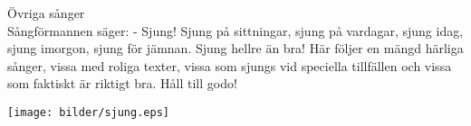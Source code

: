 \begin{flushleft}
{\Huge Övriga sånger\\}
\vspace{1cm}
{\Large
Sångförmannen säger:
- Sjung! Sjung på sittningar, sjung på vardagar, sjung idag, sjung
imorgon, sjung för jämnan. Sjung hellre än bra! Här följer en mängd härliga sånger, vissa
med roliga texter, vissa som sjungs vid speciella tillfällen och vissa
som faktiskt är riktigt bra. Håll till godo!
}
\end{flushleft}

\vspace{2cm}
\begin{center}
\texttt{[image: bilder/sjung.eps]}
\end{center}
\newpage

\newpage
\newpage
{}
\newpage
{}
\newpage
{}
\newpage
\newpage
{}
\newpage
{}
\newpage
\newpage
{}
\newpage
\newpage
{}
\newpage
{}
\newpage
{}
\newpage
{}
\newpage
{}
\newpage
{}
\newpage
{}
\newpage
{}
